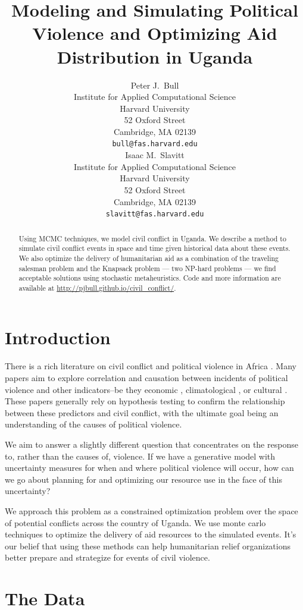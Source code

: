\documentclass{article} %
\title{Modeling and Simulating Political Violence and Optimizing Aid Distribution in Uganda}
\author{
Peter J.~Bull \\
Institute for Applied Computational Science\\
Harvard University\\
52 Oxford Street \\
Cambridge, MA 02139 \\
\texttt{bull@fas.harvard.edu} \\
\And
Isaac M.~Slavitt \\
Institute for Applied Computational Science\\
Harvard University\\
52 Oxford Street \\
Cambridge, MA 02139 \\
\texttt{slavitt@fas.harvard.edu} \\
}
\begin{document}
\maketitle

\begin{abstract}
Using MCMC techniques, we model civil conflict in Uganda. We describe a method to simulate civil conflict events in space and time given historical data about these events. We also optimize the delivery of humanitarian aid as a combination of the traveling salesman problem and the Knapsack problem --- two NP-hard problems --- we find acceptable solutions using stochastic metaheuristics. Code and more information are available at \url{http://pjbull.github.io/civil_conflict/}.
\end{abstract}
\section{Introduction}

There is a rich literature on civil conflict and political violence in Africa \cite{collier2002incidence}. Many papers aim to explore correlation and causation between incidents of political violence and other indicators--be they economic \cite{buhaug2006local}, climatological \cite{hendrix2012climate}, or cultural \cite{van1999temperature}. These papers generally rely on hypothesis testing to confirm the relationship between these predictors and civil conflict, with the ultimate goal being an understanding of the causes of political violence.

We aim to answer a slightly different question that concentrates on the response to, rather than the causes of, violence. If we have a generative model with uncertainty measures for when and where political violence will occur, how can we go about planning for and optimizing our resource use in the face of this uncertainty?

We approach this problem as a constrained optimization problem over the space of potential conflicts across the country of Uganda. We use monte carlo techniques to optimize the delivery of aid resources to the simulated events. It's our belief that using these methods can help humanitarian relief organizations better prepare and strategize for events of civil violence.

\section{The Data}
\end{document}

